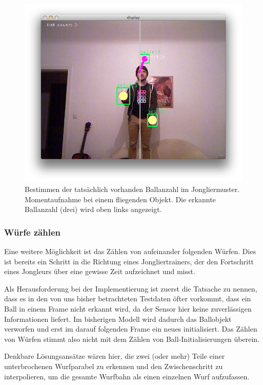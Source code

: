 \documentclass[12pt,a4paper,ngerman]{scrartcl}
\begin{document}
\begin{figure}[H]
    \centering
    \includegraphics[scale=0.5]{img/ballcount-2.png}
    \vspace{-0.5cm}
    \caption{Bestimmen der tatsächlich vorhanden Ballanzahl im Jongliermuster. Momentaufnahme bei einem fliegenden Objekt. Die erkannte Ballanzahl (drei) wird oben links angezeigt.}
    \label{ballcount-2}
\end{figure}


\subsubsection{Würfe zählen}

Eine weitere Möglichkeit ist das Zählen von aufeinander folgenden Würfen. Dies ist
bereits ein Schritt in die Richtung eines Jongliertrainers, der den Fortschritt eines
Jongleurs über eine gewisse Zeit aufzeichnet und misst.

Als Herausforderung bei der Implementierung ist zuerst die Tatsache zu nennen, dass
es in den von uns bisher betrachteten Testdaten öfter vorkommt, dass ein Ball in
einem Frame nicht erkannt wird, da der Sensor hier keine zuverlässigen Informationen
liefert. Im bisherigen Modell wird dadurch das Ballobjekt verworfen und erst im
darauf folgenden Frame ein neues initialisiert. Das Zählen von Würfen stimmt
also nicht mit dem Zählen von Ball-Initialisierungen überein.

Denkbare Lösungsansätze wären hier, die zwei (oder mehr) Teile einer unterbrochenen
Wurfparabel zu erkennen und den Zwischenschritt zu interpolieren, um die gesamte
Wurfbahn als einen einzelnen Wurf aufzufassen.
\end{document}
